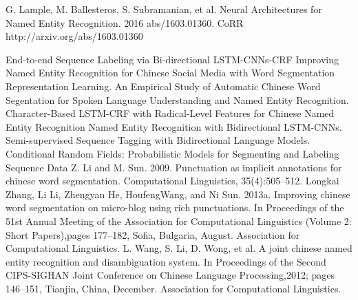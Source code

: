 \documentclass[conference]{IEEEtran}
\begin{document}
\begin{thebibliography}{00}
 G. Lample, M. Ballesteros, S. Subramanian, et al. Neural Architectures for Named Entity Recognition. 2016 abs/1603.01360. CoRR http://arxiv.org/abs/1603.01360

 End-to-end Sequence Labeling via Bi-directional LSTM-CNNs-CRF
 Improving Named Entity Recognition for Chinese Social Media with Word Segmentation Representation Learning.
An Empirical Study of Automatic Chinese Word Segentation for Spoken Language Understanding and Named Entity Recognition.
 Character-Based LSTM-CRF with Radical-Level Features for Chinese Named Entity Recognition
 Named Entity Recognition with Bidirectional LSTM-CNNs.
 Semi-supervised Sequence Tagging with Bidirectional Language Models.
 Conditional Random Fields: Probabilistic Models for Segmenting and Labeling Sequence Data
 Z. Li and M. Sun. 2009. Punctuation as implicit annotations for chinese word segmentation. Computational Linguistics, 35(4):505–512.
Longkai Zhang, Li Li, Zhengyan He, HoufengWang, and
Ni Sun. 2013a. Improving chinese word segmentation
on micro-blog using rich punctuations. In Proceedings
of the 51st Annual Meeting of the Association for
Computational Linguistics (Volume 2: Short Papers),pages 177–182, Sofia, Bulgaria, August. Association
for Computational Linguistics.
 L. Wang, S. Li, D. Wong, et al. A joint chinese named entity recognition
and disambiguation system. In Proceedings of the Second CIPS-SIGHAN Joint Conference on Chinese
Language Processing,2012; pages 146–151, Tianjin, China, December. Association for Computational Linguistics.
\end{thebibliography}
\end{document}
